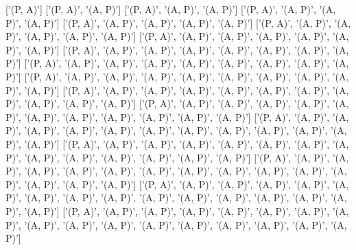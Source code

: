 ['(P, A)']
['(P, A)', '(A, P)']
['(P, A)', '(A, P)', '(A, P)']
['(P, A)', '(A, P)', '(A, P)', '(A, P)']
['(P, A)', '(A, P)', '(A, P)', '(A, P)', '(A, P)']
['(P, A)', '(A, P)', '(A, P)', '(A, P)', '(A, P)', '(A, P)']
['(P, A)', '(A, P)', '(A, P)', '(A, P)', '(A, P)', '(A, P)', '(A, P)']
['(P, A)', '(A, P)', '(A, P)', '(A, P)', '(A, P)', '(A, P)', '(A, P)', '(A, P)']
['(P, A)', '(A, P)', '(A, P)', '(A, P)', '(A, P)', '(A, P)', '(A, P)', '(A, P)', '(A, P)']
['(P, A)', '(A, P)', '(A, P)', '(A, P)', '(A, P)', '(A, P)', '(A, P)', '(A, P)', '(A, P)', '(A, P)']
['(P, A)', '(A, P)', '(A, P)', '(A, P)', '(A, P)', '(A, P)', '(A, P)', '(A, P)', '(A, P)', '(A, P)', '(A, P)']
['(P, A)', '(A, P)', '(A, P)', '(A, P)', '(A, P)', '(A, P)', '(A, P)', '(A, P)', '(A, P)', '(A, P)', '(A, P)', '(A, P)']
['(P, A)', '(A, P)', '(A, P)', '(A, P)', '(A, P)', '(A, P)', '(A, P)', '(A, P)', '(A, P)', '(A, P)', '(A, P)', '(A, P)', '(A, P)']
['(P, A)', '(A, P)', '(A, P)', '(A, P)', '(A, P)', '(A, P)', '(A, P)', '(A, P)', '(A, P)', '(A, P)', '(A, P)', '(A, P)', '(A, P)', '(A, P)']
['(P, A)', '(A, P)', '(A, P)', '(A, P)', '(A, P)', '(A, P)', '(A, P)', '(A, P)', '(A, P)', '(A, P)', '(A, P)', '(A, P)', '(A, P)', '(A, P)', '(A, P)']
['(P, A)', '(A, P)', '(A, P)', '(A, P)', '(A, P)', '(A, P)', '(A, P)', '(A, P)', '(A, P)', '(A, P)', '(A, P)', '(A, P)', '(A, P)', '(A, P)', '(A, P)', '(A, P)']
['(P, A)', '(A, P)', '(A, P)', '(A, P)', '(A, P)', '(A, P)', '(A, P)', '(A, P)', '(A, P)', '(A, P)', '(A, P)', '(A, P)', '(A, P)', '(A, P)', '(A, P)', '(A, P)', '(A, P)']
